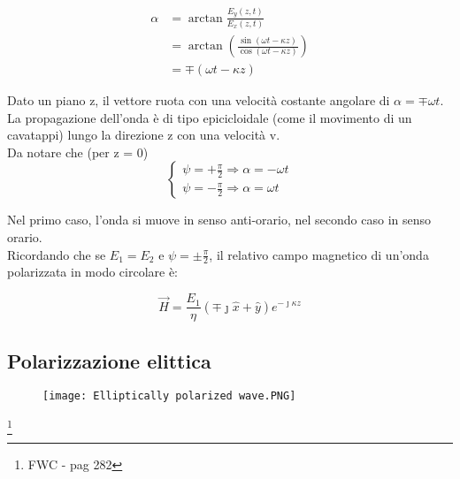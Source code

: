 {\Large \begin{equation}
    \begin{split}
        \alpha 
        &= \arctan \frac{E_y(z, t)}{E_x(z, t)} 
        \\
        &= \arctan (\frac{\sin(\omega t - \kappa z)}{\cos(\omega t - \kappa z)}) 
        \\
        &= \mp (\omega t - \kappa z)
    \end{split}
\end{equation}}


Dato un piano z, il vettore ruota con una velocità costante angolare di $\alpha = \mp \omega t$. \\ 

La propagazione dell'onda è di tipo epicicloidale (come il movimento di un cavatappi) lungo la direzione z con una velocità v. \\ 

Da notare che (per z = 0)
{\Large \begin{equation}
    \begin{cases}
     \psi = + \frac{\pi}{2} \Rightarrow \alpha = -\omega t \\ 
     \psi = - \frac{\pi}{2} \Rightarrow \alpha = \omega t 
    \end{cases}
\end{equation}}

Nel primo caso, l'onda si muove in senso anti-orario, nel secondo caso in senso orario. \\ 

Ricordando che se $E_1 = E_2$ e $\psi = \pm \frac{\pi}{2}$, il relativo campo magnetico di un'onda polarizzata in modo circolare è: 

{\Large \begin{equation}
    \vec{H} = \frac{E_1}{\eta} (\mp \jmath \hat{x} + \hat{y}) e^{- \jmath \kappa z}
\end{equation}}


\newpage 

\subsection{Polarizzazione elittica} 


\begin{figure}[h]
    \centering
    \texttt{[image: Elliptically polarized wave.PNG]}
    
\end{figure}

\footnote{FWC - pag 282}


